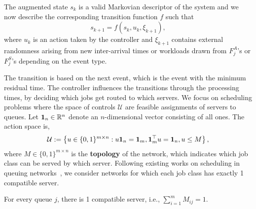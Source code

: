 
The augmented state $s_{k}$ is a valid Markovian descriptor of the system and we now describe the corresponding  transition function $f$ such that
\[
s_{k+1} = f(s_{k}, u_{k}, \xi_{k+1}),
\]
where $u_{k}$ is an action taken by the controller and $\xi_{k+1}$ contains external randomness arising from new inter-arrival times or workloads drawn from $F^{A}_{j}$'s or $F^{S}_{j}$'s depending on the event type.

The transition is based on the next event, which is the event with the minimum residual time. The controller influences the transitions through the processing times, by deciding which jobs get routed to which servers. We focus on scheduling problems where the space of controls $\mathcal{U}$ are feasible assignments of servers to queues. Let $\mathbf{1}_{n}\in \mathbb{R}^{n}$ denote an $n$-dimensional vector consisting of all ones. The action space is, 
\begin{equation}
\label{eq:action_space}
\mathcal{U}:=\left\{ u\in\{0,1\}^{m\times n}:u\mathbf{1}_{n} = \mathbf{1}_{m}, \mathbf{1}_{m}^{\top} u=\mathbf{1}_{n},u\leq M\right\},
\end{equation}
where $M\in\{0,1\}^{m\times n}$ is the {\bf topology} of the network, which indicates which job class can be served by which server. Following existing works on scheduling in queuing networks~\cite{meyn2008control}, we consider networks for which each job class has exactly 1 compatible server.
\begin{assumption} \label{ass:queue}
For every queue $j$, there is 1 compatible server,
i.e., $\sum_{i=1}^{m}M_{ij}=1$.
\end{assumption}

